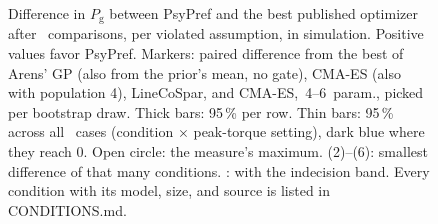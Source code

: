 \documentclass[conference]{IEEEtran}
\begin{document}
\begin{figure}[t]
\centering

\caption{Difference in $P_\mathrm{g}$ between PsyPref and the best published optimizer after \fmK\ comparisons, per
violated assumption, in simulation. Positive values favor PsyPref. Markers: paired difference from the best of Arens'
GP (also from the prior's mean, no gate), CMA-ES (also with population 4), LineCoSpar, and \mbox{CMA-ES, 4--6~param.},
picked per bootstrap draw. Thick bars: 95\,\% per row. Thin bars: 95\,\% across all \fmNall\ cases (condition
$\times$ peak-torque setting), dark blue where they reach 0. Open circle: the measure's maximum. (2)--(6): smallest
difference of that many conditions. \textdagger: with the indecision band. Every condition with its model, size, and
source is listed in CONDITIONS.md.}
\label{fig:robustness}
\end{figure}
\end{document}
